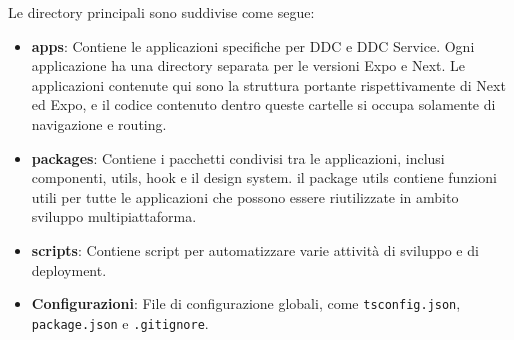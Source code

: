 Le directory principali sono suddivise come segue:
\begin{itemize}
    \item \textbf{apps}: Contiene le applicazioni specifiche per DDC e DDC Service. 
    Ogni applicazione ha una directory separata per le versioni Expo e Next.
    Le applicazioni contenute qui sono la struttura portante rispettivamente di Next ed Expo, e il codice contenuto dentro queste cartelle si occupa solamente di navigazione e routing.
    \item \textbf{packages}: Contiene i pacchetti condivisi tra le applicazioni, inclusi componenti, utils, hook e il design system.
    il package utils contiene funzioni utili per tutte le applicazioni che possono essere riutilizzate in ambito sviluppo multipiattaforma.
    \item \textbf{scripts}: Contiene script per automatizzare varie attività di sviluppo e di deployment.
    \item \textbf{Configurazioni}: File di configurazione globali, come \texttt{tsconfig.json}, \texttt{package.json} e \texttt{.gitignore}.
\end{itemize}

